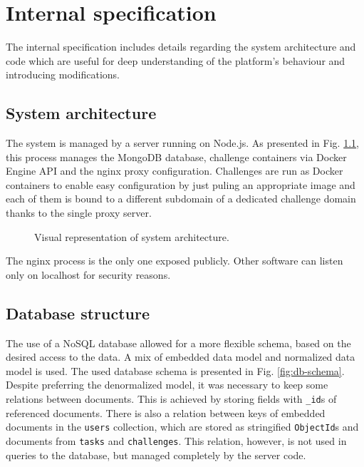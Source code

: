 \chapter{Internal specification}

The internal specification includes details regarding the system architecture and code which are useful for deep understanding of the platform's behaviour and introducing modifications.


\section{System architecture}

The system is managed by a server running on Node.js. As presented in Fig. \ref{fig:system-architecture}, this process manages the MongoDB database, challenge containers via Docker Engine API and the nginx proxy configuration. Challenges are run as Docker containers to enable easy configuration by just puling an appropriate image and each of them is bound to a different subdomain of a dedicated challenge domain thanks to the single proxy server.

\begin{figure}
    \centering
    
    \caption{Visual representation of system architecture.}
    \label{fig:system-architecture}
\end{figure}

The nginx process is the only one exposed publicly. Other software can listen only on localhost for security reasons.

\section{Database structure}

The use of a NoSQL database allowed for a more flexible schema, based on the desired access to the data. A mix of embedded data model and normalized data model is used. The used database schema is presented in Fig. \ref{fig:db-schema}. Despite preferring the denormalized model, it was necessary to keep some relations between documents. This is achieved by storing fields with \texttt{\_id}s of referenced documents. There is also a relation between keys of embedded documents in the \texttt{users} collection, which are stored as stringified \texttt{ObjectId}s and documents from \texttt{tasks} and \texttt{challenges}. This relation, however, is not used in queries to the database, but managed completely by the server code.

